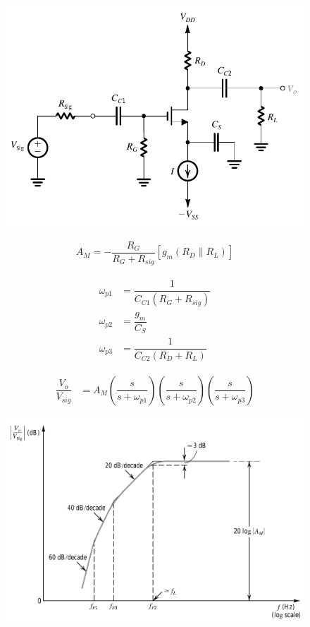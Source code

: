 \begin{figure}[H]
  \centering
  \includegraphics[width=0.6\linewidth]{figures/Frequency-Response-CS}
\end{figure}

\begin{equation*}
  \begin{aligned}
    A_M = - \dfrac{R_G}{R_G + R_{sig}} \left[ g_m \left( R_D \parallel R_L \right) \right]  
  \end{aligned}
\end{equation*}

\begin{equation*}
  \begin{aligned}
    \omega_{p1} &= \dfrac{1}{C_{C1} \left( R_G + R_{sig} \right)} \\
    \omega_{p2} &= \dfrac{g_m}{C_S} \\
    \omega_{p3} &= \dfrac{1}{C_{C2} \left( R_D + R_L \right)} 
  \end{aligned}
\end{equation*}

\begin{equation*}
  \begin{aligned}
    \dfrac{V_o}{V_{sig}} &= A_M \left( \dfrac{s}{s + \omega_{p1}}  \right) \left( \dfrac{s}{s + \omega_{p2}}  \right) \left( \dfrac{s}{s + \omega_{p3}}  \right) 
  \end{aligned}
\end{equation*}

\begin{figure}[H]
  \centering
  \includegraphics[width=0.6\linewidth]{figures/Frequency-Response-CS-freq}
\end{figure}

